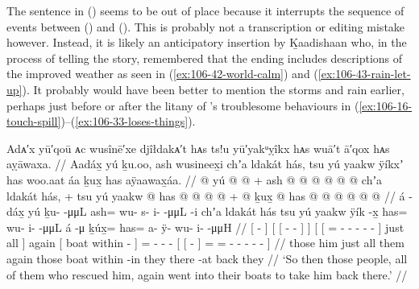 The sentence in (\lastx) seems to be out of place because it interrupts the sequence of events between (\blastx) and (\nextx).
This is probably not a transcription or editing mistake however.
Instead, it is likely an anticipatory insertion by Ḵaadishaan who, in the process of telling the story, remembered that the ending includes descriptions of the improved weather as seen in (\ref{ex:106-42-world-calm}) and (\ref{ex:106-43-rain-let-up}).
It probably would have been better to mention the storms and rain earlier, perhaps just before or after the litany of ’s troublesome behaviours in (\ref{ex:106-16-touch-spill})–(\ref{ex:106-33-loses-things}).

\ex\label{ex:106-38-take-him-back}%
%
\begingl
	\glpreamble	Adᴀ′x yū′qoū ᴀc wusînē′xe djîłdakᴀ′t hᴀs ts!u yū′yakᵘỵîkx hᴀs wuā′t ā′qox hᴀs aỵāwaxa. //
	\glpreamble	Aadáx̱ yú ḵu.oo, ash wusineex̱i chʼa ldakát hás, tsu yú yaakw ÿíkxʼ has woo.aat
				áa ḵux̱ has aÿaawax̱áa. //
	\gla	{}  @ {} {}
		{} yú {}  @ {} @ {} {} {} +
		{} {} ash @  @ {} @ {} @ {} @ {} @ {} {}
			chʼa ldakát hás, {} +
		tsu
		{} yú yaakw  @ {} {}
		has @  @ {} @ {} @ {} +
		{} {}  @ {} {}
			ḵux̱ @ has @  @ {} @ {} @ {} @ {} @ {} {} //
	\glb	{} á -dáx̱ {} 
		{} yú {} ḵu-  -μμL {} {}
		{} {} ash= wu- s- i-  -μμL -i {}
			chʼa ldakát hás {}
		tsu
		{} yú yaakw ÿík -x̱ {} 
		has= wu- i-  -μμL
		{} {} á -μ {}
			ḵúx̱= has= a- ÿ- wu- i-  -μμH {} //
	\glc	{}[  - {}]
		{}[  {}[ -  - {}] {}]
		{}[	{}[ = - - -  - - {}]
			just all  {}]
		again
		{}[  boat within - {}]
		= - -  -
		{}[ {}[  - {}]
			= = - - - -  - {}] //	
	\gld	{}  {} {}
		{} those {}  {} {} {} {} 
		{} {} him  {} {} {} {} {} {} 
			just all them {}
		again
		{} those boat within -in {}
		they  {} {} {}
		{} {} there -at {}
			back they  {} {} {} {} {} {} //
	\glft	‘So then those people, all of them who rescued him, again went into their boats
		to take him back there.’
		//
\endgl
\xe

